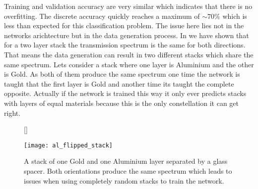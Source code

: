 Training and validation accuracy are very similar which indicates that there is no overfitting. The discrete accuracy quickly reaches a maximum of $\sim 70\%$
which is less than expected for this classification problem. The issue here lies not in the networks arichtecture but in the data generation process. In 
we have shown that for a two layer stack the transmission spectrum is the same for both directions. That means the data generation can result in two different stacks which share the same spectrum. Lets consider a stack where one layer is Aluminium and the other is Gold. As both of them produce the same spectrum one time the network is taught that the first layer is Gold and another time its taught the complete opposite. Actually if the network is trained this way it only ever predicts stacks with layers of equal materials because this is the only constellation it can get right.
\\

\begin{figure}[H]
    [\FBwidth]
    {\caption{A stack of one Gold and one Aluminium layer separated by a glass spacer. Both orientations produce the same spectrum which leads to issues when using completely random stacks to train the network.}
    \label{fig:test}}
    {\texttt{[image: al\_flipped\_stack]}}
\end{figure}
